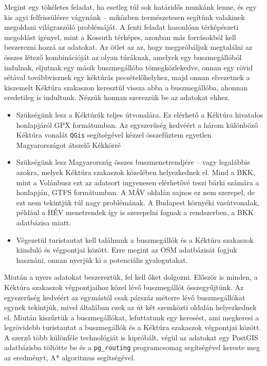 \documentclass[a5paper,10pt]{article}
\begin{document}
\bigskip

Megint egy tökéletes feladat, ha esetleg túl sok határidős munkánk lenne, és egy kis agyi felfrissülésre vágynánk -- miközben természetesen segítünk valakinek megoldani világraszóló problémáját. A fenti feladat hasonlóan térképészeti megoldást igényel, mint a Kossuth térképes, azonban más forrásokból kell beszerezni hozzá az adatokat. Az ötlet az az, hogy megpróbáljuk megtalálni az összes létező kombinációját az olyan túráknak, amelyek egy buszmegállóból indulnak, eljutnak egy másik buszmegállóba tömegközlekedve, onnan egy rövid sétával továbbvisznek egy kéktúrás pecsételőhelyhez, majd onnan elvezetnek a kiszemelt Kéktúra szakaszon keresztül vissza abba a buszmegállóba, ahonnan eredetileg is indultunk. Nézzük honnan szerezzük be az adatokat ehhez.

\begin{itemize}
    \item Szükségünk lesz a Kéktúrák teljes útvonalára. Ez elérhető a Kéktúra hivatalos honlapjáról GPX formátumban. Az egyszerűség kedvéért a három különböző Kéktúra vonalát \texttt{QGis} segítségével kézzel összefűztem egyetlen Magyarországot átszelő Kékkörré
    \item Szükségünk lesz Magyarország összes buszmenetrendjére -- vagy legalábbis azokra, melyek Kéktúra szakaszok közelében helyezkednek el. Mind a BKK, mint a Volánbusz ezt az adatsort ingyenesen elérhetővé teszi bárki számára a honlapján, GTFS formátumban. A MÁV oldalán sajnos ez nem szerepel, de ezt nem tekintjük túl nagy problémának. A Budapest környéki vasútvonalak, például a HÉV menetrendek így is szerepelni fognak a rendszerben, a BKK adatbázisa miatt.
    \item Végezetül turistautat kell találnunk a buszmegállók és a Kéktúra szakaszok kiinduló és végpontjai között. Erre megint az OSM adatbázisát fogjuk hasznáni, onnan nyerjük ki a potenciális gyalogutakat.
\end{itemize}

Miután a nyers adatokat beszereztük, fel kell őket dolgozni. Először is minden, a Kéktúra szakaszok végpontjaihoz közel lévő buszmegállót összegyűjtünk. Az egyszerűség kedvéért az egymástól csak párszáz méterre lévő buszmegállókat egynek tekintjük, mivel általában ezek az út két szemközti oldalán helyezkednek el. Miután kiszűrtük a buszmegállókat, lefuttatunk egy keresést, ami megkeresi a legrövidebb turistautat a buszmegállók és a Kéktúra szakaszok végpontjai között. A szerző több különféle technológiát is kipróbált, végül az adatokat egy PostGIS\cite{postgis} adatbázisba töltötte be és a \texttt{pg\_routing} programcsomag segítségével kereste meg az eredményt, A* algoritmus segítségével.
\end{document}
